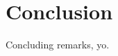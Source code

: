 \documentclass[]{aiaa-tc}%
\begin{document}



\section{Conclusion} \label{sec:conclusion}

Concluding remarks, yo.



\end{document}
